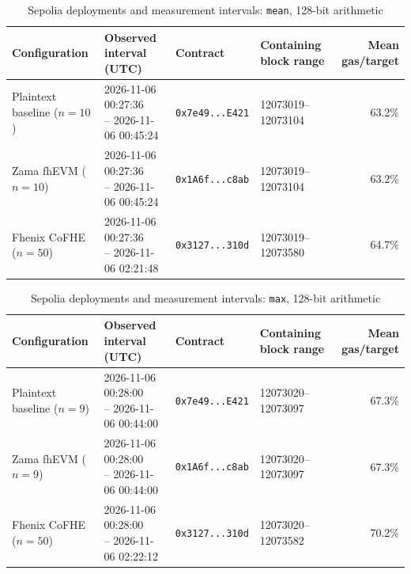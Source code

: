 \begin{table}[!t]
\caption{Sepolia deployments and measurement intervals: \texttt{mean}, 128-bit arithmetic}
\label{tab:sepolia-experiment-deployments-classic-euint128-mean}
\centering
\footnotesize
\setlength{\tabcolsep}{4pt}
\begin{tabular}{|l|l|l|l|r|}
\hline
\textbf{Configuration} &
\textbf{Observed interval (UTC)} &
\textbf{Contract} &
\textbf{Containing block range} &
\textbf{Mean gas/target} \\
\hline
Plaintext baseline (\(n=10\)) &
\shortstack[l]{2026-11-06 00:27:36 \\ -- 2026-11-06 00:45:24} &
\texttt{0x7e49...E421} &
12073019--12073104 &
63.2\% \\
\hline
Zama fhEVM (\(n=10\)) &
\shortstack[l]{2026-11-06 00:27:36 \\ -- 2026-11-06 00:45:24} &
\texttt{0x1A6f...c8ab} &
12073019--12073104 &
63.2\% \\
\hline
Fhenix CoFHE (\(n=50\)) &
\shortstack[l]{2026-11-06 00:27:36 \\ -- 2026-11-06 02:21:48} &
\texttt{0x3127...310d} &
12073019--12073580 &
64.7\% \\
\hline
\end{tabular}
\end{table}

\begin{table}[!t]
\caption{Sepolia deployments and measurement intervals: \texttt{max}, 128-bit arithmetic}
\label{tab:sepolia-experiment-deployments-classic-euint128-max}
\centering
\footnotesize
\setlength{\tabcolsep}{4pt}
\begin{tabular}{|l|l|l|l|r|}
\hline
\textbf{Configuration} &
\textbf{Observed interval (UTC)} &
\textbf{Contract} &
\textbf{Containing block range} &
\textbf{Mean gas/target} \\
\hline
Plaintext baseline (\(n=9\)) &
\shortstack[l]{2026-11-06 00:28:00 \\ -- 2026-11-06 00:44:00} &
\texttt{0x7e49...E421} &
12073020--12073097 &
67.3\% \\
\hline
Zama fhEVM (\(n=9\)) &
\shortstack[l]{2026-11-06 00:28:00 \\ -- 2026-11-06 00:44:00} &
\texttt{0x1A6f...c8ab} &
12073020--12073097 &
67.3\% \\
\hline
Fhenix CoFHE (\(n=50\)) &
\shortstack[l]{2026-11-06 00:28:00 \\ -- 2026-11-06 02:22:12} &
\texttt{0x3127...310d} &
12073020--12073582 &
70.2\% \\
\hline
\end{tabular}
\end{table}

